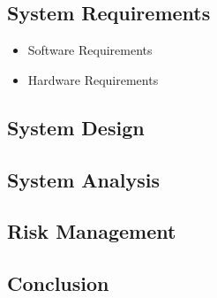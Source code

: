 \documentclass[10pt,a4paper]{article}
\begin{document}
	\subsection{System Requirements}
		\begin{itemize}
		\item Software Requirements
		\item Hardware Requirements
		\end{itemize}
\begin{large}
\section{System Design}
\end{large}

\begin{large}
\section{System Analysis}
\end{large}

\begin{large}
\section{Risk Management}
\end{large}

\begin{large}
\section{Conclusion}
\end{large}

\end{document}
